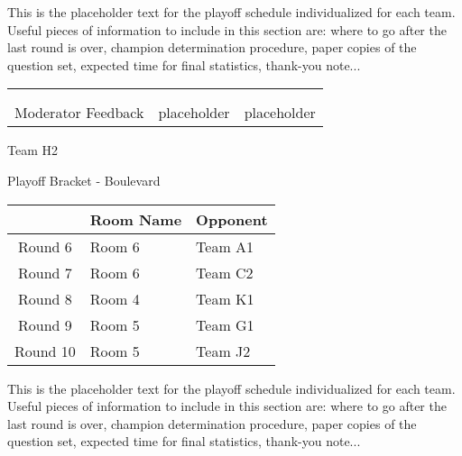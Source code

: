 \documentclass{article}%
\begin{document}
\vspace*{30pt}%
\linebreak%
This is the placeholder text for the playoff schedule individualized for each team. Useful pieces of information to include in this section are: where to go after the last round is over, champion determination procedure, paper copies of the question set, expected time for final statistics, thank{-}you note...%
\vspace*{30pt}%
\newline%
%
\begin{tabularx}{\textwidth}{YYY}%
  &  &  \\%
\\%
Moderator Feedback&placeholder&placeholder\\%
\end{tabularx}%
\newpage%
\begin{center}%
\begin{Huge}%
Team H2%
\end{Huge}%
\vspace*{12pt}%
\linebreak%
\begin{Large}%
Playoff Bracket {-} Boulevard%
\end{Large}%
\end{center}%
\vspace*{4pt}%
%
\begin{tabularx}{\textwidth}{|c|Y|Y|}%
\hline%
&Room Name&Opponent\\%
\hline%
Round 6&Room 6&Team A1\\%
Round 7&Room 6&Team C2\\%
Round 8&Room 4&Team K1\\%
Round 9&Room 5&Team G1\\%
Round 10&Room 5&Team J2\\%
\hline%
\end{tabularx}%
\vspace*{30pt}%
\linebreak%
This is the placeholder text for the playoff schedule individualized for each team. Useful pieces of information to include in this section are: where to go after the last round is over, champion determination procedure, paper copies of the question set, expected time for final statistics, thank{-}you note...%
\vspace*{30pt}%
\end{document}
